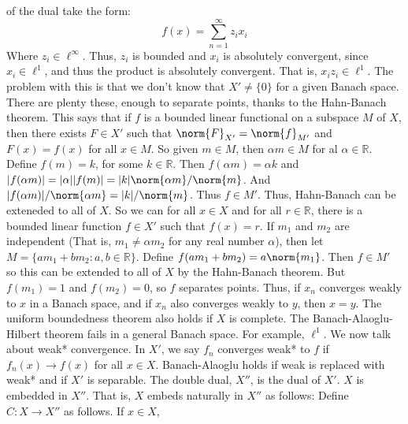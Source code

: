         of the dual take the form:
        \begin{equation}
            f(x)=\sum_{n=1}^{\infty}z_{i}x_{i}
        \end{equation}
        Where $z_{i}\in\ell^{\infty}$. Thus, $z_{i}$ is
        bounded and $x_{i}$ is absolutely convergent,
        since $x_{i}\in\ell^{1}$, and thus the product
        is absolutely convergent. That is,
        $x_{i}z_{i}\in\ell^{1}$. The problem with this is
        that we don't know that $X'\ne\{0\}$ for a given
        Banach space. There are plenty these, enough to
        separate points, thanks to the Hahn-Banach theorem.
        This says that if $f$ is a bounded linear functional
        on a subspace $M$ of $X$, then there exists
        $F\in{X'}$ such that
        $\norm{F}_{X'}=\norm{f}_{M'}$ and
        $F(x)=f(x)$ for all $x\in{M}$. So given $m\in{M}$,
        then $\alpha{m}\in{M}$ for al $\alpha\in\mathbb{R}$.
        Define $f(m)=k$, for some $k\in\mathbb{R}$. Then
        $f(\alpha{m})=\alpha{k}$ and
        $|f(\alpha{m})|=|\alpha||f(m)|%
         =|k|\norm{\alpha{m}}/\norm{m}$. And
         $|f(\alpha{m})|/\norm{\alpha{m}}=|k|/\norm{m}$.
        Thus $f\in{M'}$. Thus, Hahn-Banach can be exteneded
        to all of $X$. So we can for all $x\in{X}$ and for
        all $r\in\mathbb{R}$, there is a bounded linear
        function $f\in{X'}$ such that
        $f(x)=r$. If $m_{1}$ and $m_{2}$ are independent
        (That is, $m_{1}\ne\alpha{m}_{2}$ for any real
        number $\alpha$), then let
        $M=\{am_{1}+bm_{2}:a,b\in\mathbb{R}\}$. Define
        $f(am_{1}+bm_{2})=a\norm{m_{1}}$.
        Then $f\in{M'}$ so this
        can be extended to all of $X$ by the Hahn-Banach
        theorem. But $f(m_{1})=1$ and
        $f(m_{2})=0$, so $f$ separates points. Thus,
        if $x_{n}$ converges weakly to $x$ in a
        Banach space, and if $x_{n}$ also converges weakly
        to $y$, then $x=y$. The uniform boundedness theorem
        also holds if $X$ is complete. The
        Banach-Alaoglu-Hilbert theorem fails in a general
        Banach space. For example, $\ell^{1}$. We now talk
        about weak* convergence. In $X'$, we say
        $f_{n}$ converges weak* to $f$ if
        $f_{n}(x)\rightarrow{f(x)}$ for all
        $x\in{X}$. Banach-Alaoglu holds if weak is replaced
        with weak* and if $X'$ is separable. The double
        dual, $X''$, is the dual of $X'$. $X$ is
        embedded in $X''$. That is, $X$ embeds naturally
        in $X''$ as follows: Define
        $C:X\rightarrow{X''}$ as follows. If $x\in{X}$,
